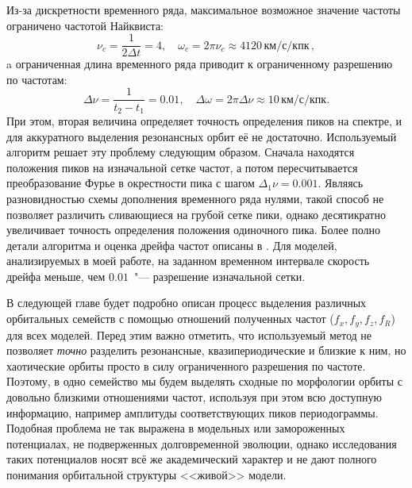 \documentclass{trlnotes}
\begin{document}
Из-за дискретности временного ряда, максимальное возможное значение частоты ограничено частотой Найквиста: 
\[
  ν_c = \frac{1}{2 Δt} = 4, \quad ω_c = 2\pi ν_c \approx 4120\,\text{км}/\text{с}/\text{кпк}\,,
\]
a ограниченная длина временного ряда приводит к ограниченному разрешению по частотам: 
\[
  Δν = \frac{1}{t_2 - t_1} = 0.01, \quad Δω = 2\pi Δν \approx 10\,\text{км}/\text{с}/\text{кпк}.
\]
При этом, вторая величина определяет точность определения пиков на спектре, и для аккуратного выделения резонансных
орбит её не достаточно.  Используемый алгоритм решает эту проблему следующим образом. Сначала находятся положения пиков
на изначальной сетке частот, а потом пересчитывается преобразование Фурье в окрестности пика с шагом $Δ_1ν = 0.001$.
Являясь разновидностью схемы дополнения временного ряда нулями, такой способ не позволяет различить сливающиеся на
грубой сетке пики, однако десятикратно увеличивает точность определения положения одиночного пика. Более полно детали
алгоритма и оценка дрейфа частот описаны в \citet{parul2020}. Для моделей, анализируемых в моей работе, на заданном
временном интервале скорость дрейфа меньше, чем $0.01$~"--- разрешение изначальной сетки.

В следующей главе будет подробно описан процесс выделения различных орбитальных семейств с помощью отношений полученных
частот ($f_x, f_y, f_z, f_R$) для всех моделей. Перед этим важно отметить, что используемый метод не позволяет
\emph{точно} разделить резонансные, квазипериодические и близкие к ним, но хаотические орбиты просто в силу
ограниченного разрешения по частоте. Поэтому, в одно семейство мы будем выделять сходные по морфологии орбиты с
довольно близкими отношениями частот, используя при этом всю доступную информацию, например амплитуды соответствующих
пиков периодограммы. Подобная проблема не так выражена в модельных или замороженных потенциалах, не подверженных
долговременной эволюции, однако исследования таких потенциалов носят всё же академический характер и не дают полного
понимания орбитальной структуры <<живой>> модели.
\end{document}
